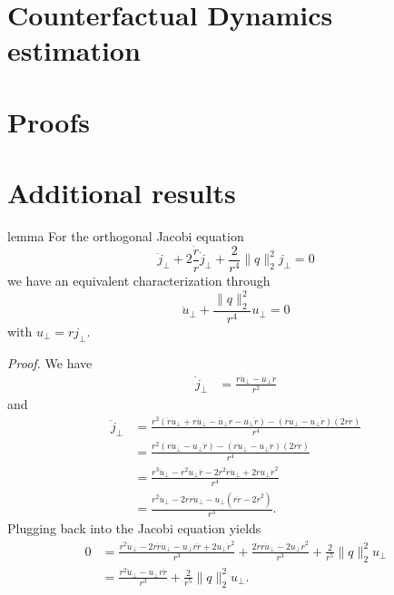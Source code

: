 \documentclass{article}
\begin{document}
\section{Counterfactual Dynamics estimation}



\appendix

\section{Proofs}

\section{Additional results}

\begin{restatable}{lemma}{} \label{lemma: orthog jacobi equation}
    For the orthogonal Jacobi equation
    \begin{equation}
        \ddot j_{\perp} +  2\frac{\dot r}{r}\dot j_{\perp} + \frac{2}{r^4}\|q\|_2^2j_{\perp} = 0
    \end{equation}
    we have an equivalent characterization through
    \begin{equation}
        \ddot u_{\perp} + \frac{\|q\|_2^2}{r^4}u_\perp = 0
    \end{equation}
    with $u_\perp = rj_{\perp}$.
\end{restatable}
\noindent \textit{Proof.} We have
\begin{align}
    \dot j_{\perp} &= \frac{r\dot u_{\perp} - u_\perp \dot r}{r^2}
\end{align}
and 
\begin{align}
    \ddot j_{\perp} &= \frac{r^2(\dot r\dot u_{\perp} + r \ddot u_{\perp} - \dot u_\perp \dot r - u_\perp \ddot r) - (r\dot u_{\perp} - u_\perp \dot r)(2r\dot r)}{r^4} \\
    &= \frac{r^2(r \ddot u_{\perp} - u_\perp \ddot r) - (r\dot u_{\perp} - u_\perp \dot r)(2r\dot r)}{r^4} \\
    &= \frac{r^3 \ddot u_{\perp} - r^2u_\perp \ddot r - 2r^2\dot r\dot u_{\perp} + 2ru_\perp \dot r^2}{r^4} \\
    &= \frac{r^2 \ddot u_{\perp} - 2r\dot r\dot u_{\perp}- u_\perp\left(r \ddot r - 2 \dot r^2\right)}{r^3}.
\end{align}
Plugging back into the Jacobi equation yields
\begin{align}
    0 &= \frac{r^2 \ddot u_{\perp} - 2r\dot r\dot u_{\perp}- u_\perp r\ddot r + 2 u_{\perp}\dot r^2}{r^3} + \frac{2\dot rr\dot u_{\perp} - 2u_\perp \dot r^2}{r^3} + \frac{2}{r^5}\|q\|_2^2u_{\perp} \\
    &= \frac{r^2 \ddot u_{\perp} - u_\perp r\ddot r}{r^3} + \frac{2}{r^5}\|q\|_2^2u_{\perp}.
\end{align}
\end{document}
